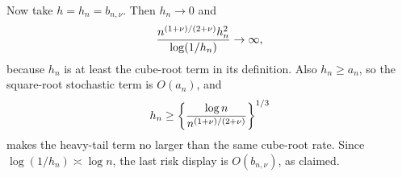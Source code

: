 Now take \(h=h_n=b_{n,\nu}\).  Then \(h_n\to0\) and
\[
 {n^{(1+\nu)/(2+\nu)}h_n^2\over\log(1/h_n)}\to\infty,
\]
because \(h_n\) is at least the cube-root term in its definition.  Also \(h_n\geq a_n\), so the square-root stochastic term is \(O(a_n)\), and
\[
 h_n\geq\left\{{\log n\over n^{(1+\nu)/(2+\nu)}}\right\}^{1/3}
\]
makes the heavy-tail term no larger than the same cube-root rate.  Since \(\log(1/h_n)\asymp\log n\), the last risk display is \(O(b_{n,\nu})\), as claimed.